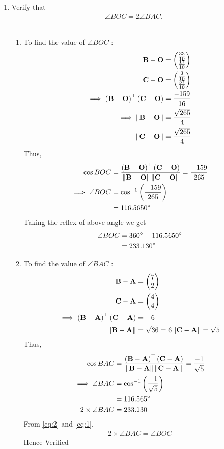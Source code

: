 \documentclass[11pt]{book}
\begin{document}
\begin{enumerate}[label=\thesection.\arabic*.,ref=\thesection.\theenumi]
\item Verify that 
\begin{align}
\angle BOC = 2\angle BAC.
\end{align}\\
 \solution
\begin{enumerate}
\item To find  the value of $\angle{BOC}$ :
\begin{align}
\mathbf{B}-\mathbf{O}
          &=\begin{pmatrix}\frac{33}{10}\\\frac{17}{10}\end{pmatrix} \\
\mathbf{C}-\mathbf{O}
         & =\begin{pmatrix}\frac{3}{10}\\\frac{37}{10}\end{pmatrix}
	  \\
\implies \left(\mathbf{B}-\mathbf{O}\right)^{\top}\left(\mathbf{C}-\mathbf{O}\right)&=\frac{-159}{16}\\
	\implies \left\lVert\mathbf{B}-\mathbf{O}\right\rVert&= \frac{\sqrt{265}}{4} \\
	\left\lVert\mathbf{C}-\mathbf{O}\right\rVert &= \frac{\sqrt{265}}{4}
\end{align}
Thus,
\begin{align}
\cos{BOC}&=\frac{\left(\mathbf{B}-\mathbf{O}\right)^{\top}\left(\mathbf{C}-\mathbf{O}\right)}{\left\lVert\mathbf{B}-\mathbf{O}\right\rVert\left\lVert\mathbf{C}-\mathbf{O}\right\rVert}
=\frac{-159}{265}\\
\implies\angle{BOC}&=\cos^{-1}\left(\frac{-159}{265}\right)
\\
	&=116.5650\degree
\end{align}
Taking the reflex of above angle we get 
\begin{align}
    \angle{BOC}&=360\degree-116.5650\degree \\
    &= 233.130\degree
\end{align}
	\item To find  the value of $\angle{BAC}$ :
\begin{align}
\mathbf{B}-\mathbf{A}&=\begin{pmatrix}7\\2\end{pmatrix} \\
\mathbf{C}-\mathbf{A}&=\begin{pmatrix}4\\4\end{pmatrix}
\\
\implies \left(\mathbf{B}-\mathbf{A}\right)^{\top}\left(\mathbf{C}-\mathbf{A}\right)&=-6
\\
	\left\lVert\mathbf{B}-\mathbf{A}\right\rVert&= \sqrt{36}= 6
	\left\lVert\mathbf{C}-\mathbf{A}\right\rVert= \sqrt{5}
\end{align}
Thus,
\begin{align}
\cos{BAC}&=\frac{\brak{\vec{B}-\vec{A}}^{\top}\brak{\vec{C}-\vec{A}}}{\norm{\vec{B}-\vec{A}}\norm{\vec{C}-\vec{A}}}
=\frac{-1}{\sqrt{5}}\\
\implies\angle{BAC}&=\cos^{-1}\brak{\frac{-1}{\sqrt{5}}}\\
&=116.565\degree \label{eq:2}  \\
2\times\angle{BAC} &= 233.130
\end{align}
From \eqref{eq:2} and \eqref{eq:1},
\begin{align}
2\times\angle{BAC}
= \angle{BOC}
\end{align}
Hence Verified
\end{enumerate}


\end{enumerate}
\end{document}
